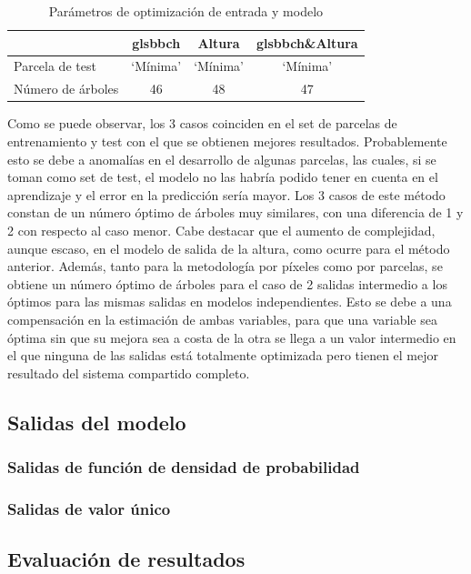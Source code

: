 \begin{table}[h]
\centering
\begin{tabular}{l|ccc}
                  & gls{bbch}     & Altura   & gls{bbch}\&Altura \\ \hline
Parcela de test   & `Mínima' & `Mínima' & `Mínima'     \\
Número de árboles & 46       & 48       & 47          
\end{tabular}
\caption{Parámetros de optimización de entrada y modelo \label{tab:opt_pixl}}
\end{table}

\par Como se puede observar, los 3 casos coinciden en el set de parcelas de entrenamiento y test con el que se obtienen mejores resultados. Probablemente esto se debe a anomalías en el desarrollo de algunas parcelas, las cuales, si se toman como set de test, el modelo no las habría podido tener en cuenta en el aprendizaje y el error en la predicción sería mayor. Los 3 casos de este método constan de un número óptimo de árboles muy similares, con una diferencia de 1 y 2 con respecto al caso menor. Cabe destacar que el aumento de complejidad, aunque escaso, en el modelo de salida de la altura, como ocurre para el método anterior. Además, tanto para la metodología por píxeles como por parcelas, se obtiene un número óptimo de árboles para el caso de 2 salidas intermedio a los óptimos para las mismas salidas en modelos independientes. Esto se debe a una compensación en la estimación de ambas variables, para que una variable sea óptima sin que su mejora sea a costa de la otra se llega a un valor intermedio en el que ninguna de las salidas está totalmente optimizada pero tienen el mejor resultado del sistema compartido completo. 


\subsection{Salidas del modelo}
\subsubsection{Salidas de función de densidad de probabilidad}
\subsubsection{Salidas de valor único}
\subsection{Evaluación de resultados}
